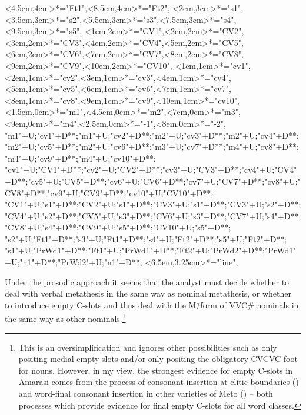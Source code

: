 \begin{multicols}{2}
\begin{exe}
{			<4.5em,4cm>*="Ft1",<8.5em,4cm>*="Ft2",
			<2em,3cm>*="s1",<3.5em,3cm>*="s2",<5.5em,3cm>*="s3",<7.5em,3cm>*="s4",<9.5em,3cm>*="s5",
			<1em,2cm>*="CV1",<2em,2cm>*="CV2",<3em,2cm>*="CV3",<4em,2cm>*="CV4",<5em,2cm>*="CV5",<6em,2cm>*="CV6",<7em,2cm>*="CV7",<8em,2cm>*="CV8",<9em,2cm>*="CV9",<10em,2cm>*="CV10",
			<1em,1cm>*="cv1",<2em,1cm>*="cv2",<3em,1cm>*="cv3",<4em,1cm>*="cv4",<5em,1cm>*="cv5",<6em,1cm>*="cv6",<7em,1cm>*="cv7",<8em,1cm>*="cv8",<9em,1cm>*="cv9",<10em,1cm>*="cv10",
			<1.5em,0cm>*="m1",<4.5em,0cm>*="m2",<7em,0cm>*="m3",<9em,0cm>*="m4",<2.5em,0cm>*\as{-}="-1",<8em,0cm>*\as{-}="-2",
			"m1"+U;"cv1"+D**\dir{-};"m1"+U;"cv2"+D**\dir{-};"m2"+U;"cv3"+D**\dir{-};"m2"+U;"cv4"+D**\dir{-};"m2"+U;"cv5"+D**\dir{-};"m2"+U;"cv6"+D**\dir{-};"m3"+U;"cv7"+D**\dir{-};"m4"+U;"cv8"+D**\dir{-};"m4"+U;"cv9"+D**\dir{-};"m4"+U;"cv10"+D**\dir{-};
			"cv1"+U;"CV1"+D**\dir{-};"cv2"+U;"CV2"+D**\dir{-};"cv3"+U;"CV3"+D**\dir{-};"cv4"+U;"CV4"+D**\dir{-};"cv5"+U;"CV5"+D**\dir{-};"cv6"+U;"CV6"+D**\dir{-};"cv7"+U;"CV7"+D**\dir{-};"cv8"+U;"CV8"+D**\dir{-};"cv9"+U;"CV9"+D**\dir{-};"cv10"+U;"CV10"+D**\dir{-};
			"CV1"+U;"s1"+D**\dir{-};"CV2"+U;"s1"+D**\dir{-};"CV3"+U;"s1"+D**\dir{-};"CV3"+U;"s2"+D**\dir{-};"CV4"+U;"s2"+D**\dir{-};"CV5"+U;"s3"+D**\dir{-};"CV6"+U;"s3"+D**\dir{-};"CV7"+U;"s4"+D**\dir{-};"CV8"+U;"s4"+D**\dir{-};"CV9"+U;"s5"+D**\dir{-};"CV10"+U;"s5"+D**\dir{-};
			"s2"+U;"Ft1"+D**\dir{-};"s3"+U;"Ft1"+D**\dir{-};"s4"+U;"Ft2"+D**\dir{-};"s5"+U;"Ft2"+D**\dir{-};
			"s1"+U;"PrWd1"+D**\dir{-};"Ft1"+U;"PrWd1"+D**\dir{-};"Ft2"+U;"PrWd2"+D**\dir{-};"PrWd1"+U;"n1"+D**\dir{-};"PrWd2"+U;"n1"+D**\dir{-};
			<6.5em,3.25cm>*="line",
		\endxy}\label{as:misoup-main2}
	\end{exe}
\end{multicols}

\largerpage
Under the prosodic approach it seems that
the analyst must decide whether to deal with
verbal metathesis in the same way as nominal metathesis,
or whether to introduce empty C-slots and thus
deal with the M\=/form of VVC{\#} nominals in the same way as other nominals.\footnote{
		This is an oversimplification and ignores other possibilities
		such as only positing medial empty slots and/or only positing
		the obligatory CVCVC foot for nouns.
		However, in my view, the strongest evidence for empty C-slots
		in Amarasi comes from the process of consonant insertion
		at clitic boundaries () and word-final
		consonant insertion in other varieties of Meto ()
		-- both processes which provide evidence for final empty C-slots for all word classes.}

